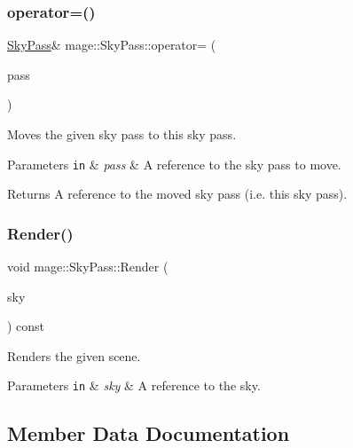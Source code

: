 \subsubsection{\texorpdfstring{operator=()}{operator=()}\hspace{0.1cm}{\footnotesize\ttfamily [2/2]}}
{\footnotesize\ttfamily \hyperlink{classmage_1_1_sky_pass}{Sky\+Pass}\& mage\+::\+Sky\+Pass\+::operator= (\begin{DoxyParamCaption}\item[{\hyperlink{classmage_1_1_sky_pass}{Sky\+Pass} \&\&}]{pass }\end{DoxyParamCaption})\hspace{0.3cm}{\ttfamily [delete]}}

Moves the given sky pass to this sky pass.


\begin{DoxyParams}[1]{Parameters}
\mbox{\tt in}  & {\em pass} & A reference to the sky pass to move. \\
\hline
\end{DoxyParams}
\begin{DoxyReturn}{Returns}
A reference to the moved sky pass (i.\+e. this sky pass). 
\end{DoxyReturn}
\hypertarget{classmage_1_1_sky_pass_a832e22543e9de25e316dd03d96ccf34b}{}\label{classmage_1_1_sky_pass_a832e22543e9de25e316dd03d96ccf34b} 
\subsubsection{\texorpdfstring{Render()}{Render()}}
{\footnotesize\ttfamily void mage\+::\+Sky\+Pass\+::\+Render (\begin{DoxyParamCaption}\item[{const \hyperlink{classmage_1_1_sky}{Sky} \&}]{sky }\end{DoxyParamCaption}) const\hspace{0.3cm}{\ttfamily [noexcept]}}

Renders the given scene.


\begin{DoxyParams}[1]{Parameters}
\mbox{\tt in}  & {\em sky} & A reference to the sky. \\
\hline
\end{DoxyParams}


\subsection{Member Data Documentation}
\hypertarget{classmage_1_1_sky_pass_aaa4d6a7c12dbad7938433f2d32107f27}{}\label{classmage_1_1_sky_pass_aaa4d6a7c12dbad7938433f2d32107f27} 
